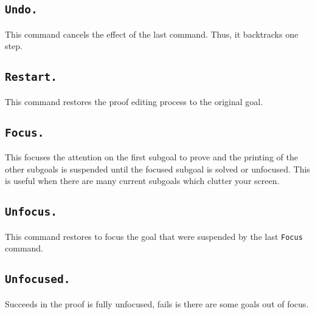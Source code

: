 \subsection[\tt Undo.]{\tt Undo.}

This command cancels the effect of the last command.  Thus, it
backtracks one step.


\subsection[\tt Restart.]{\tt Restart.}
This command restores the proof editing process to the original goal.

\begin{ErrMsgs}
\item {}
\end{ErrMsgs}

\subsection[\tt Focus.]{\tt Focus.}
This focuses the attention on the first subgoal to prove and the printing
of the other subgoals is suspended until the focused subgoal is
solved or unfocused. This is useful when there are many current
subgoals which clutter your screen.


\subsection[\tt Unfocus.]{\tt Unfocus.}
This command restores to focus the goal that were suspended by the
last {\tt Focus} command.

\subsection[\tt Unfocused.]{\tt Unfocused.}
Succeeds in the proof is fully unfocused, fails is there are some
goals out of focus.

